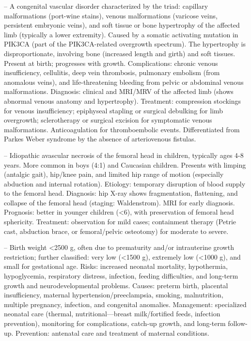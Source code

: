 -- A congenital vascular disorder characterized by the triad: capillary malformations (port-wine stains), venous malformations (varicose veins, persistent embryonic veins), and soft tissue or bone hypertrophy of the affected limb (typically a lower extremity). Caused by a somatic activating mutation in PIK3CA (part of the PIK3CA-related overgrowth spectrum). The hypertrophy is disproportionate, involving bone (increased length and girth) and soft tissues. Present at birth; progresses with growth. Complications: chronic venous insufficiency, cellulitis, deep vein thrombosis, pulmonary embolism (from anomalous veins), and life-threatening bleeding from pelvic or abdominal venous malformations. Diagnosis: clinical and MRI/MRV of the affected limb (shows abnormal venous anatomy and hypertrophy). Treatment: compression stockings for venous insufficiency; epiphyseal stapling or surgical debulking for limb overgrowth; sclerotherapy or surgical excision for symptomatic venous malformations. Anticoagulation for thromboembolic events. Differentiated from Parkes Weber syndrome by the absence of arteriovenous fistulas.

-- Idiopathic avascular necrosis of the femoral head in children, typically ages 4-8 years. More common in boys (4:1) and Caucasian children. Presents with limping (antalgic gait), hip/knee pain, and limited hip range of motion (especially abduction and internal rotation). Etiology: temporary disruption of blood supply to the femoral head. Diagnosis: hip X-ray shows fragmentation, flattening, and collapse of the femoral head (staging: Waldenstrom). MRI for early diagnosis. Prognosis: better in younger children (<6), with preservation of femoral head sphericity. Treatment: observation for mild cases; containment therapy (Petrie cast, abduction brace, or femoral/pelvic osteotomy) for moderate to severe.

-- Birth weight <2500 g, often due to prematurity and/or intrauterine growth restriction; further classified: very low (<1500 g), extremely low (<1000 g), and small for gestational age. Risks: increased neonatal mortality, hypothermia, hypoglycemia, respiratory distress, infection, feeding difficulties, and long-term growth and neurodevelopmental problems. Causes: preterm birth, placental insufficiency, maternal hypertension/preeclampsia, smoking, malnutrition, multiple pregnancy, infection, and congenital anomalies. Management: specialized neonatal care (thermal, nutritional—breast milk/fortified feeds, infection prevention), monitoring for complications, catch-up growth, and long-term follow-up. Prevention: antenatal care and treatment of maternal conditions.

